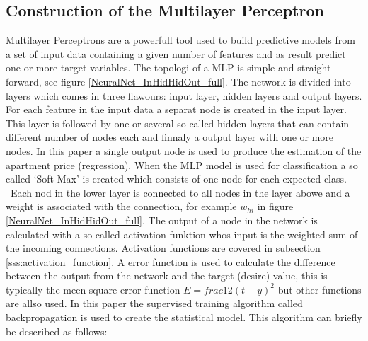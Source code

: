 \subsection{Construction of the Multilayer Perceptron}
Multilayer Perceptrons are a powerfull tool used to build predictive models from a set of input data containing a given number of features and as result predict one or more target variables. The topologi of a MLP is simple and straight forward, see figure \ref{NeuralNet_InHidHidOut_full}. The network is divided into layers which comes in three flawours: input layer, hidden layers and output layers. For each feature in the input data a separat node is created in the input layer. This layer is followed by one or several so called hidden layers that can contain different number of nodes each and finnaly a output layer with one or more nodes. In this paper a single output node is used to produce the estimation of the apartment price (regression). When the MLP model is used for classification a so called `Soft Max' is created which consists of one node for each expected class. 
\
Each nod in the lower layer is connected to all nodes in the layer abowe and a weight is associated with the connection, for example $w_{hi}$ in figure \ref{NeuralNet_InHidHidOut_full}. The output of a node in the network is calculated with a so called activation funktion whos input is the weighted sum of the incoming connections. Activation functions are covered in subsection \ref{sss:activation_function}. A error function is used to calculate the difference between the output from the network and the target (desire) value, this is typically the meen square error function $E = frac{1}{2} (t - y)^{2} $ but other functions are allso used. In this paper the supervised training algorithm called backpropagation is used to create the statistical model. This algorithm can briefly be described as follows:
\
\begin{itemize}

\end{itemize} 

